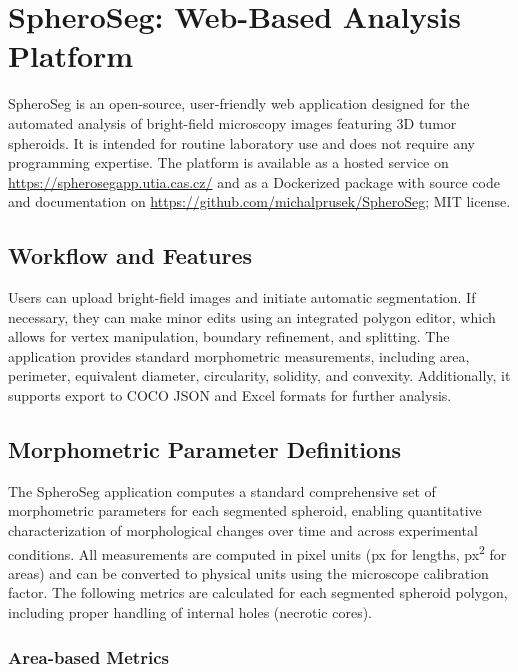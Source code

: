 \documentclass[preprint,12pt]{elsarticle}
\newcommand{\app}{SpheroSeg}
\begin{document}
\section{SpheroSeg: Web-Based Analysis Platform}
\label{sec:spheroseg}

SpheroSeg is an open-source, user-friendly web application designed for the automated analysis of bright-field microscopy images featuring 3D tumor spheroids. It is intended for routine laboratory use and does not require any programming expertise. The platform is available as a hosted service on 
\href{https://spherosegapp.utia.cas.cz/}{https://spherosegapp.utia.cas.cz/} and as a Dockerized package with source code and documentation on \href{https://github.com/michalprusek/SpheroSeg}{https://github.com/michalprusek/SpheroSeg}; MIT license.

\subsection{Workflow and Features}
Users can upload bright-field images and initiate automatic segmentation. If necessary, they can make minor edits using an integrated polygon editor, which allows for vertex manipulation, boundary refinement, and splitting. The application provides standard morphometric measurements, including area, perimeter, equivalent diameter, circularity, solidity, and convexity. Additionally, it supports export to COCO JSON and Excel formats for further analysis.

\subsection{Morphometric Parameter Definitions}
\label{sec:metrics}

The \app{} application computes a standard comprehensive set of morphometric parameters for each segmented spheroid, enabling quantitative characterization of morphological changes over time and across experimental conditions. All measurements are computed in pixel units (px for lengths, px\textsuperscript{2} for areas) and can be converted to physical units using the microscope calibration factor. The following metrics are calculated for each segmented spheroid polygon, including proper handling of internal holes (necrotic cores).

\subsubsection{Area-based Metrics}
\end{document}
